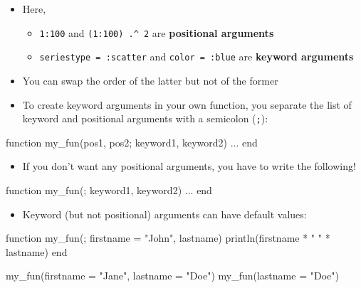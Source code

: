 \documentclass[
  letterpaper,
  DIV=11,
  numbers=noendperiod]{scrartcl}
\newenvironment{Shaded}{\begin{snugshade}}{\end{snugshade}}
\newcommand{\FunctionTok}[1]{\textcolor[rgb]{0.28,0.35,0.67}{#1}}
\newcommand{\KeywordTok}[1]{\textcolor[rgb]{0.00,0.23,0.31}{#1}}
\newcommand{\NormalTok}[1]{\textcolor[rgb]{0.00,0.23,0.31}{#1}}
\newcommand{\OperatorTok}[1]{\textcolor[rgb]{0.37,0.37,0.37}{#1}}
\newcommand{\StringTok}[1]{\textcolor[rgb]{0.13,0.47,0.30}{#1}}
\providecommand{\tightlist}{%
  \setlength{\itemsep}{0pt}\setlength{\parskip}{0pt}}\usepackage{longtable,booktabs,array}
\begin{document}
\begin{itemize}
\tightlist
\item
  Here,

  \begin{itemize}
  \tightlist
  \item
    \texttt{1:100} and \texttt{(1:100)\ .\^{}\ 2} are \textbf{positional
    arguments}
  \item
    \texttt{seriestype\ =\ :scatter} and \texttt{color\ =\ :blue} are
    \textbf{keyword arguments}
  \end{itemize}
\item
  You can swap the order of the latter but not of the former
\end{itemize}

\begin{itemize}
\tightlist
\item
  To create keyword arguments in your own function, you separate the
  list of keyword and positional arguments with a semicolon
  (\texttt{;}):
\end{itemize}

\begin{Shaded}
\begin{Highlighting}[]
\KeywordTok{function} \FunctionTok{my\_fun}\NormalTok{(pos1, pos2; keyword1, keyword2)}
  \OperatorTok{...}
\KeywordTok{end}
\end{Highlighting}
\end{Shaded}

\begin{itemize}
\tightlist
\item
  If you don't want any positional arguments, you have to write the
  following!
\end{itemize}

\begin{Shaded}
\begin{Highlighting}[]
\KeywordTok{function} \FunctionTok{my\_fun}\NormalTok{(; keyword1, keyword2)}
  \OperatorTok{...}
\KeywordTok{end}
\end{Highlighting}
\end{Shaded}

\begin{itemize}
\tightlist
\item
  Keyword (but not positional) arguments can have default values:
\end{itemize}

\begin{Shaded}
\begin{Highlighting}[]
\KeywordTok{function} \FunctionTok{my\_fun}\NormalTok{(; firstname }\OperatorTok{=} \StringTok{"John"}\NormalTok{, lastname)}
  \FunctionTok{println}\NormalTok{(firstname }\OperatorTok{*} \StringTok{" "} \OperatorTok{*}\NormalTok{ lastname)}
\KeywordTok{end}

\FunctionTok{my\_fun}\NormalTok{(firstname }\OperatorTok{=} \StringTok{"Jane"}\NormalTok{, lastname }\OperatorTok{=} \StringTok{"Doe"}\NormalTok{)}
\FunctionTok{my\_fun}\NormalTok{(lastname }\OperatorTok{=} \StringTok{"Doe"}\NormalTok{)}
\end{Highlighting}
\end{Shaded}
\end{document}

